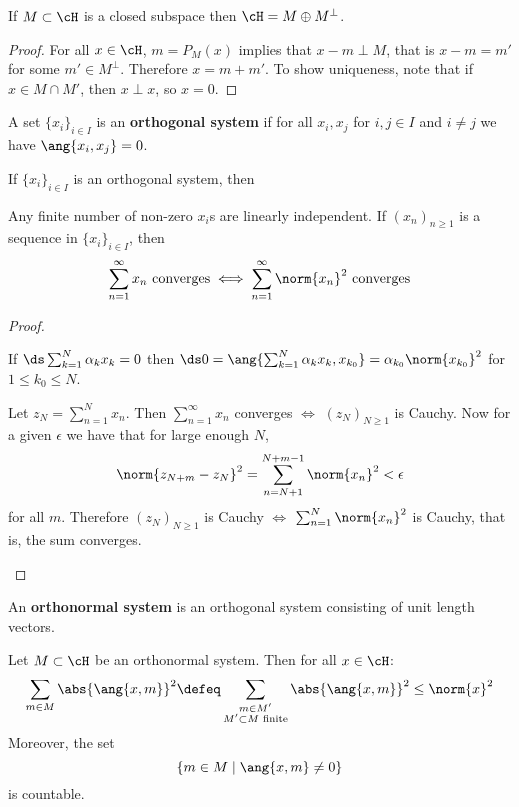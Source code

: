 \begin{cor}
	If $M \subset \cH$ is a closed subspace then $\cH = M \oplus M^\perp$.
\end{cor}

\begin{proof}
	For all $x \in \cH$, $m = P_M(x)$ implies that $x-m \perp M$, that is $x-m=m'$ for some $m' \in M^\perp$.
	Therefore $x = m+m'$.
	To show uniqueness, note that if $x \in M \cap M'$, then $x \perp x$, so $x=0$.
\end{proof}

\begin{defn}
	A set $\{x_i\}_{i \in I}$ is an \textbf{orthogonal system} if for all $x_i,x_j$ for $i,j \in I$ and $i \neq j$ we have $\ang{x_i,x_j}=0$.
\end{defn}

\begin{lem}
	If $\{x_i\}_{i \in I}$ is an orthogonal system, then
	\begin{enum}
		\io Any finite number of non-zero $x_i$s are linearly independent.
		\io If $(x_n)_{n \geq 1}$ is a sequence in $\{x_i\}_{i \in I}$, then
		\[\sum_{n=1}^\infty x_n \text{ converges} \iff \sum_{n=1}^\infty \norm{x_n}^2 \text{ converges}\]
	\end{enum}
\end{lem}

\begin{proof}
	\begin{enum}
		\io If $\ds \sum_{k=1}^N \alpha_k x_k = 0$ then $\ds 0 = \ang{\sum_{k=1}^N \alpha_k x_k, x_{k_0}} = \alpha_{k_0} \norm{x_{k_0}}^2$ for $1 \leq k_0 \leq N$.
		
		\io Let $z_N = \sum_{n=1}^N x_n$.
		Then $\sum_{n=1}^\infty x_n$ converges $\iff$ $(z_N)_{N \geq 1}$ is Cauchy.
		Now for a given $\epsilon$ we have that for large enough $N$,
		\[\norm{z_{N+m}-z_N}^2 = \sum_{n=N+1}^{N+m-1} \norm{x_n}^2 < \epsilon\]
		for all $m$.
		Therefore $(z_N)_{N \geq 1}$ is Cauchy $\iff $ $\sum_{n=1}^N \norm{x_n}^2$ is Cauchy, that is, the sum converges.
		
	\end{enum}
\end{proof}

\begin{defn}
	An \textbf{orthonormal system} is an orthogonal system consisting of unit length vectors.
\end{defn}

\begin{thm}
	Let $M \subset \cH$ be an orthonormal system.
	Then for all $x \in \cH$:
	\[\sum_{m \in M} \abs{\ang{x,m}}^2 \defeq \sum_{\substack{m \in M' \\ M' \subset M \text{ finite}}} \abs{\ang{x,m}}^2 \leq \norm{x}^2\]
	Moreover, the set
	\[\{m \in M \mid \ang{x,m} \neq 0\}\]
	is countable.
\end{thm}

